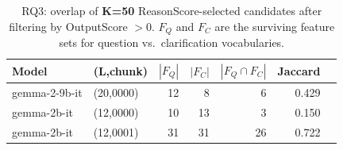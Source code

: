 \begin{table}[t]
\centering
\small
\begin{tabular}{llrrrrr}
\toprule
Model & (L,chunk) & $|F_Q|$ & $|F_C|$ & $|F_Q\cap F_C|$ & Jaccard \\
\midrule
gemma-2-9b-it & (20,0000) & 12 & 8 & 6 & 0.429 \\
gemma-2b-it & (12,0000) & 10 & 13 & 3 & 0.150 \\
gemma-2b-it & (12,0001) & 31 & 31 & 26 & 0.722 \\
\bottomrule
\end{tabular}
\caption{RQ3: overlap of \textbf{K=50} ReasonScore-selected candidates after filtering by OutputScore $>0$. $F_Q$ and $F_C$ are the surviving feature sets for question vs.\ clarification vocabularies.}
\label{tab:rq3-overlap-summary}
\end{table}